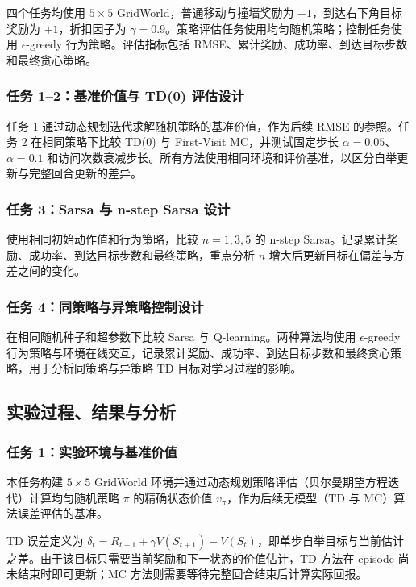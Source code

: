 \documentclass[11pt,a4paper,UTF8]{ctexart}
\numberwithin{figure}{section}
\numberwithin{table}{section}
\begin{document}
四个任务均使用 $5\times5$ GridWorld，普通移动与撞墙奖励为 $-1$，到达右下角目标奖励为 $+1$，折扣因子为 $\gamma=0.9$。策略评估任务使用均匀随机策略；控制任务使用 $\epsilon$-greedy 行为策略。评估指标包括 RMSE、累计奖励、成功率、到达目标步数和最终贪心策略。

\subsubsection{任务 1--2：基准价值与 TD(0) 评估设计}

任务 1 通过动态规划迭代求解随机策略的基准价值，作为后续 RMSE 的参照。任务 2 在相同策略下比较 TD(0) 与 First-Visit MC，并测试固定步长 $\alpha=0.05$、$\alpha=0.1$ 和访问次数衰减步长。所有方法使用相同环境和评价基准，以区分自举更新与完整回合更新的差异。

\subsubsection{任务 3：Sarsa 与 n-step Sarsa 设计}

使用相同初始动作值和行为策略，比较 $n=1,3,5$ 的 n-step Sarsa。记录累计奖励、成功率、到达目标步数和最终策略，重点分析 $n$ 增大后更新目标在偏差与方差之间的变化。

\subsubsection{任务 4：同策略与异策略控制设计}

在相同随机种子和超参数下比较 Sarsa 与 Q-learning。两种算法均使用 $\epsilon$-greedy 行为策略与环境在线交互，记录累计奖励、成功率、到达目标步数和最终贪心策略，用于分析同策略与异策略 TD 目标对学习过程的影响。




\subsection{实验过程、结果与分析}

\subsubsection{任务 1：实验环境与基准价值}

本任务构建 $5\times5$ GridWorld 环境并通过动态规划策略评估（贝尔曼期望方程迭代）计算均匀随机策略 $\pi$ 的精确状态价值 $v_\pi$，作为后续无模型（TD 与 MC）算法误差评估的基准。

TD 误差定义为 $\delta_t=R_{t+1}+\gamma V(S_{t+1})-V(S_t)$，即单步自举目标与当前估计之差。由于该目标只需要当前奖励和下一状态的价值估计，TD 方法在 episode 尚未结束时即可更新；MC 方法则需要等待完整回合结束后计算实际回报。
\end{document}
